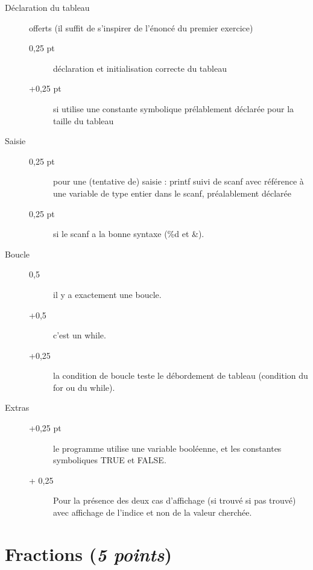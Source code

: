 \begin{correction}
\begin{baremeenv}
\begin{description}
\item[Déclaration du tableau]  offerts (il suffit de
  s'inspirer de l'énoncé du premier exercice)
   \begin{description}
   \item[0,25 pt] déclaration et initialisation correcte du tableau
   \item[+0,25 pt] si utilise une constante symbolique prélablement
     déclarée pour la taille du tableau
   \end{description}
 \item[Saisie] 
  \begin{description}
  \item[0,25 pt] pour une (tentative de) saisie : printf suivi de scanf
    avec référence à une variable de type entier dans le scanf,
    préalablement déclarée
  \item[0,25 pt] si le scanf a la bonne syntaxe (\%d et \&).
  \end{description}
\item[Boucle] 
  \begin{description}
  \item[0,5] il y a exactement une boucle.
  \item[+0,5] c'est un while.
  \item[+0,25] la condition de boucle teste le débordement de tableau
    (condition du for ou du while).
  \end{description}
\item[Extras] 
  \begin{description}
  \item[+0,25 pt] le programme utilise une variable booléenne, et les
    constantes symboliques TRUE et FALSE.
  \item[+ 0,25] Pour la présence des deux cas d'affichage (si trouvé
    si pas trouvé) avec affichage de l'indice et non de la valeur
    cherchée.
  \end{description}
 \end{description}
\end{baremeenv}
\end{correction}

\section{Fractions (\emph{5 points})}

